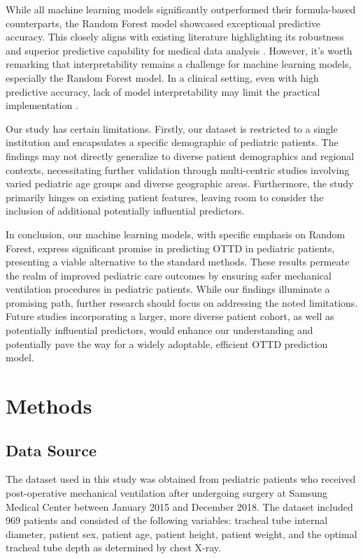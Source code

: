 \documentclass[11pt]{article}
\begin{document}
While all machine learning models significantly outperformed their formula-based counterparts, the Random Forest model showcased exceptional predictive accuracy. This closely aligns with existing literature highlighting its robustness and superior predictive capability for medical data analysis \cite{Rudin2018StopEB}. However, it's worth remarking that interpretability remains a challenge for machine learning models, especially the Random Forest model. In a clinical setting, even with high predictive accuracy, lack of model interpretability may limit the practical implementation \cite{Rudin2018StopEB}.

Our study has certain limitations. Firstly, our dataset is restricted to a single institution and encapsulates a specific demographic of pediatric patients. The findings may not directly generalize to diverse patient demographics and regional contexts, necessitating further validation through multi-centric studies involving varied pediatric age groups and diverse geographic areas. Furthermore, the study primarily hinges on existing patient features, leaving room to consider the inclusion of additional potentially influential predictors.

In conclusion, our machine learning models, with specific emphasis on Random Forest, express significant promise in predicting OTTD in pediatric patients, presenting a viable alternative to the standard methods. These results permeate the realm of improved pediatric care outcomes by ensuring safer mechanical ventilation procedures in pediatric patients. While our findings illuminate a promising path, further research should focus on addressing the noted limitations. Future studies incorporating a larger, more diverse patient cohort, as well as potentially influential predictors, would enhance our understanding and potentially pave the way for a widely adoptable, efficient OTTD prediction model.

\section*{Methods}

\subsection*{Data Source}
The dataset used in this study was obtained from pediatric patients who received post-operative mechanical ventilation after undergoing surgery at Samsung Medical Center between January 2015 and December 2018. The dataset included 969 patients and consisted of the following variables: tracheal tube internal diameter, patient sex, patient age, patient height, patient weight, and the optimal tracheal tube depth as determined by chest X-ray.
\end{document}

